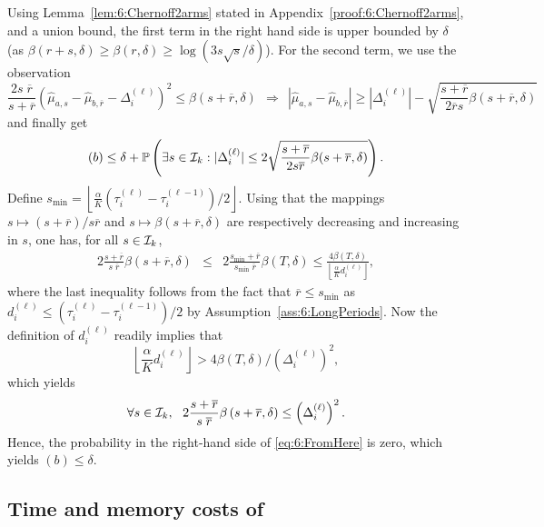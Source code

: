 Using Lemma~\ref{lem:6:Chernoff2arms} stated in Appendix~\ref{proof:6:Chernoff2arms}, and a union bound, the first term in the right hand side is upper bounded by $\delta$ (as $\beta(r+s,\delta) \geq \beta(r,\delta) \geq \log(3s\sqrt{s}/\delta)$). For the second term, we use the observation
\[\frac{2s \; \overline{r}}{s+\overline{r}}\left(\widehat{\mu}_{a,s} - \widehat{\mu}_{b,\overline{r}} - \Delta_i^{(\ell)}\right)^2  \leq \beta(s+\overline{r},\delta) \ \ \Rightarrow \ \ |\widehat{\mu}_{a,s} - \widehat{\mu}_{b,\overline{r}}| \geq |\Delta_i^{(\ell)}| - \sqrt{\frac{s+\overline{r}}{2\overline{r}s}\beta(s+\overline{r},\delta)}\]
and finally get
%
\begin{equation}\label{eq:6:FromHere}
    (b) \leq \delta + \mathbb{P}\left(\exists s \in \mathcal{I}_k : |\Delta_i^{(\ell)}| \leq 2\sqrt{\frac{s+\overline{r}}{2s\overline{r}}\beta(s+\overline{r},\delta)}\right).
\end{equation}
%
Define $s_{\min} = \left\lfloor \frac{\alpha}{K} (\tau_i^{(\ell)}-\tau_i^{(\ell-1)})/2\right\rfloor$. Using that the mappings $s \mapsto (s+\overline{r})/s\overline{r}$ and $s \mapsto \beta(s + \overline{r},\delta)$ are respectively decreasing and increasing in $s$, one has, for all $s\in \mathcal{I}_k$,
\begin{eqnarray*}
    2\frac{s+\overline{r}}{s \; \overline{r}}\beta\left(s+\overline{r}, \delta\right) & \leq &
    2\frac{s_{\min}+\overline{r}}{s_{\min} \; \overline{r}}\beta\left(T, \delta\right) \leq \frac{4\beta(T,\delta)}{\left\lfloor \frac{\alpha}{K}d_i^{(\ell)}\right\rfloor},
\end{eqnarray*}
%
where the last inequality follows from the fact that $\overline{r} \leq s_{\min}$ as $d_i^{(\ell)} \leq (\tau_i^{(\ell)} - \tau_i^{(\ell-1)})/2$ by Assumption~\ref{ass:6:LongPeriods}. Now the definition of $d_i^{(\ell)}$ readily implies that
\[\left\lfloor \frac{\alpha}{K}d_i^{(\ell)}\right\rfloor > 4\beta(T,\delta) / \left(\Delta_i^{(\ell)}\right)^2,\]
which yields
\[\forall s \in \cI_k, \ \ 2\frac{s+\overline{r}}{s \; \overline{r}}\beta\left(s+\overline{r}, \delta\right) \leq \left(\Delta_i^{(\ell)}\right)^2.\]
Hence, the probability in the right-hand side of \eqref{eq:6:FromHere} is zero, which yields $(b) \leq \delta$.


\subsection{Time and memory costs of \GLRklUCB}
\label{app:6:EmpiricalPerformances}

